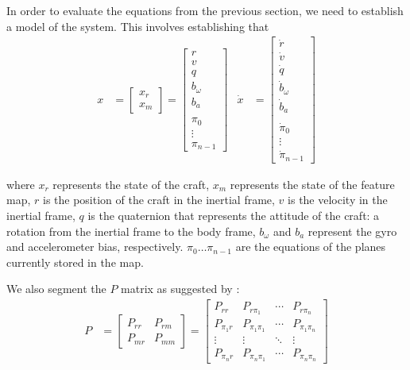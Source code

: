 \documentclass[]{article}
\begin{document}
{In order to evaluate the equations from the previous section, we need to establish a model of the system. This involves establishing that 
\begin{align}
	x &=
	\left[
	\begin{matrix}
		x_r \\
		x_m
	\end{matrix}
	\right]
	=
	\left[
	\begin{matrix}
		r \\
		v \\
		q \\
		b_\omega \\
		b_a \\
		\\
		\pi_0 \\
		\vdots \\
		\pi_{n-1}
	\end{matrix}
	\right]
	&
	\dot{x} &= 
	\left[
	\begin{matrix}
		\dot{r} \\
		\dot{v} \\
		\dot{q} \\
		\dot{b}_\omega \\
		\dot{b}_a \\
		\\
		\dot{\pi}_0 \\
		\vdots \\
		\dot{\pi}_{n-1}
	\end{matrix}
	\right]
\end{align}

where $x_r$ represents the state of the craft, $x_m$ represents the state of the feature map, $r$ is the position of the craft in the inertial frame, $v$ is the velocity in the inertial frame, $q$ is the quaternion that represents the attitude of the craft: a rotation from the inertial frame to the body frame, $b_\omega$ and $b_a$ represent the gyro and accelerometer bias, respectively. $\pi_0 \hdots \pi_{n-1}$ are the equations of the planes currently stored in the map.

We also segment the $P$ matrix as suggested by \cite{Sola2013}:
\begin{align}
	P &=
	\left[
	\begin{matrix}
		P_{rr} 	& P_{rm} \\
		P_{mr} 	& P_{mm}
	\end{matrix}
	\right]
	=
	\left[
	\begin{matrix}
		P_{rr} 		& P_{r \pi_1} 		& \cdots 	& P_{r \pi_n} \\
		P_{\pi_1 r} & P_{\pi_1 \pi_1}	& \cdots 	& P_{\pi_1 \pi_n} \\
		\vdots		& \vdots 			& \ddots 	& \vdots \\
		P_{\pi_n r} & P_{\pi_n \pi_1} 	& \cdots 	& P_{\pi_n \pi_n}
	\end{matrix}
	\right]
	\label{eqn:Pparts}
\end{align}

}
\end{document}
